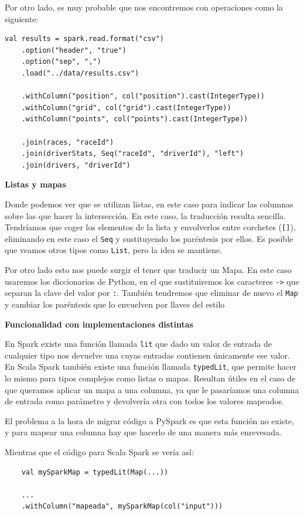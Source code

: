 \documentclass[12pt,twoside,titlepage]{report}
\begin{document}
Por otro lado, es muy probable que nos encontremos con operaciones como la siguiente:

\begin{lstlisting}
val results = spark.read.format("csv")
	.option("header", "true")
	.option("sep", ",")
	.load("../data/results.csv")

	.withColumn("position", col("position").cast(IntegerType))    
	.withColumn("grid", col("grid").cast(IntegerType))    
	.withColumn("points", col("points").cast(IntegerType))

	.join(races, "raceId")
	.join(driverStats, Seq("raceId", "driverId"), "left")
	.join(drivers, "driverId")
\end{lstlisting}

\textbf{Listas y mapas}

Donde podemos ver que se utilizan listas, en este caso para indicar las columnas sobre las que hacer la intersección. En este caso, la traducción resulta sencilla. Tendríamos que coger los elementos de la lista y envolverlos entre corchetes (\texttt{[]}), eliminando en este caso el \texttt{Seq} y sustituyendo los paréntesis por ellos. Es posible que veamos otros tipos como \texttt{List}, pero la idea se mantiene.

Por otro lado esto nos puede surgir el tener que traducir un Mapa. En este caso usaremos los diccionarios de Python, en el que sustituiremos los caracteres \texttt{->} que separan la clave del valor por \texttt{:}. También tendremos que eliminar de nuevo el \texttt{Map} y cambiar los paréntesis que lo envuelven por llaves del estilo \texttt{{}}

\textbf{Funcionalidad con implementaciones distintas}

En Spark existe una función llamada \texttt{lit} que dado un valor de entrada de cualquier tipo nos devuelve una cuyas entradas contienen únicamente ese valor. En Scala Spark también existe una función llamada \texttt{typedLit}, que permite hacer lo mismo para tipos complejos como listas o mapas. Resultan útiles en el caso de que queramos aplicar un mapa a una columna, ya que le pasaríamos una columna de entrada como parámetro y devolvería otra con todos los valores mapeados. 

El problema a la hora de migrar código a PySpark es que esta función no existe, y para mapear una columna hay que hacerlo de una manera más enrevesada.

Mientras que el código para Scala Spark se vería así:

\begin{lstlisting}
	val mySparkMap = typedLit(Map(...))
	
	...
	.withColumn("mapeada", mySparkMap(col("input")))
\end{lstlisting}
\end{document}
